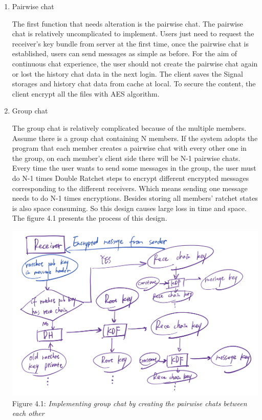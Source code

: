 \begin{enumerate}[label=(\roman*)]
\item Pairwise chat

The first function that needs alteration is the pairwise chat. The pairwise chat is relatively uncomplicated to implement. Users just need to request the receiver's key bundle from server at the first time, once the pairwise chat is established, users can send messages as simple as before. For the aim of continuous chat experience, the user should not create the pairwise chat again or lost the history chat data in the next login. The client saves the Signal storages and history chat data from cache at local. To secure the content, the client encrypt all the files with AES algorithm.

\item Group chat

The group chat is relatively complicated because of the multiple members. Assume there is a group chat containing N members. If the system adopts the program that each member creates a pairwise chat with every other one in the group, on each member's client side there will be N-1 pairwise chats. Every time the user wants to send some messages in the group, the user must do N-1 times Double Ratchet steps to encrypt different encrypted messages corresponding to the different receivers. Which means sending one message needs to do N-1 times encryptions. Besides storing all members' ratchet states is also space consuming. So this design causes large loss in time and space. The figure 4.1 presents the process of this design.

\begin{center}
\includegraphics[scale=.5]{../3-Background/resources/DH-rece.png}\\
Figure 4.1: \textit{Implementing group chat by creating the pairwise chats between each other}
\end{center}


\end{enumerate}
